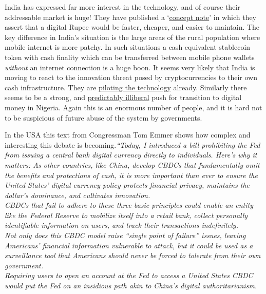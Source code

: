 \begin{itemize}
India has expressed far more interest in the technology, and of course their addressable market is huge! They have published a  `\href{https://twitter.com/RBI/status/1578329048446828544?}{concept note}' in which they assert that a digital Rupee would be faster, cheaper, and easier to maintain. The key difference in India's situation is the large areas of the rural population where mobile internet is more patchy. In such situations a cash equivalent stablecoin token with cash finality which can be transferred between mobile phone wallets \textit{without} an internet connection is a huge boon. It seems very likely that India is moving to react to the innovation threat posed by cryptocurrencies to their own cash infrastructure. They are \href{https://www.reuters.com/article/idUSKBN2RQ0WO}{piloting the technology} already. Similarly there seems to be a strong, and \href{https://www.bloomberg.com/news/articles/2022-12-06/nigeria-limits-cash-transactions-to-push-enaira-and-other-payments}{predictably illiberal} push for transition to digital money in Nigeria. Again this is an enormous number of people, and it is hard not to be suspicious of future abuse of the system by governments.\par
In the USA this text from Congressman Tom Emmer shows how complex and interesting this debate is becoming.\textit{``Today, I introduced a bill prohibiting the Fed from issuing a central bank digital currency directly to individuals. Here’s why it matters: As other countries, like China, develop CBDCs that fundamentally omit the benefits and protections of cash, it is more important than ever to ensure the United States’ digital currency policy protects financial privacy, maintains the dollar’s dominance, and cultivates innovation.\\
CBDCs that fail to adhere to these three basic principles could enable an entity like the Federal Reserve to mobilize itself into a retail bank, collect personally identifiable information on users, and track their transactions indefinitely.\\
Not only does this CBDC model raise ``single point of failure'' issues, leaving Americans’ financial information vulnerable to attack, but it could be used as a surveillance tool that Americans should never be forced to tolerate from their own government.\\
Requiring users to open an account at the Fed to access a United States CBDC would put the Fed on an insidious path akin to China’s digital authoritarianism.\\
}
\end{itemize}
